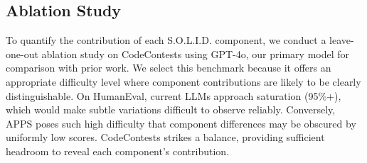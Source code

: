 \documentclass[11pt]{article}
\begin{document}
\subsection{Ablation Study}

%
%

To quantify the contribution of each S.O.L.I.D. component, we conduct a leave-one-out ablation study on CodeContests using GPT-4o, our primary model for comparison with prior work.
We select this benchmark because it offers an appropriate difficulty level where component contributions are likely to be clearly distinguishable.
On HumanEval, current LLMs approach saturation (95\%+), which would make subtle variations difficult to observe reliably.
Conversely, APPS poses such high difficulty that component differences may be obscured by uniformly low scores.
CodeContests strikes a balance, providing sufficient headroom to reveal each component's contribution.
\end{document}
